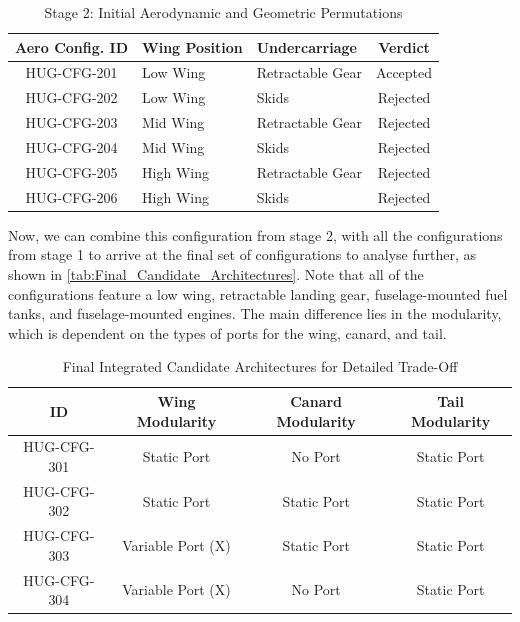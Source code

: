 \begin{table}[H]
    \centering
    \caption{Stage 2: Initial Aerodynamic and Geometric Permutations}
    \label{tab:Stage2_Aero_Configurations_Table}
    \renewcommand{\arraystretch}{1.3}
    \begin{tabular}{|c|p{4cm}|p{4cm}|c|}
        \hline
        \textbf{Aero Config. ID} & \textbf{Wing Position} & \textbf{Undercarriage} & \textbf{Verdict} \\
        \hline\hline
        HUG-CFG-201 & Low Wing & Retractable Gear & Accepted \\
        \hline
        HUG-CFG-202 & Low Wing & Skids & Rejected \\
        \hline
        HUG-CFG-203 & Mid Wing & Retractable Gear & Rejected \\
        \hline
        HUG-CFG-204 & Mid Wing & Skids & Rejected \\
        \hline
        HUG-CFG-205 & High Wing & Retractable Gear & Rejected \\
        \hline
        HUG-CFG-206 & High Wing & Skids & Rejected \\
        \hline
    \end{tabular}
\end{table}

Now, we can combine this configuration from stage 2, with all the configurations from stage 1 to arrive at the final set of configurations to analyse further, as shown in \autoref{tab:Final_Candidate_Architectures}. Note that all of the configurations feature a low wing, retractable landing gear, fuselage-mounted fuel tanks, and fuselage-mounted engines. The main difference lies in the modularity, which is dependent on the types of ports for the wing, canard, and tail.

\begin{table}[H]
    \centering
    \caption{Final Integrated Candidate Architectures for Detailed Trade-Off}
    \label{tab:Final_Candidate_Architectures}
    \renewcommand{\arraystretch}{1.3}
    \begin{tabular}{|c|c|c|c|}
        \hline
        \textbf{ID} & \textbf{Wing Modularity} & \textbf{Canard Modularity} & \textbf{Tail Modularity}    \\
        \hline\hline
        HUG-CFG-301 & Static Port & No Port & Static Port   \\
        \hline
        HUG-CFG-302 & Static Port &  Static Port & Static Port  \\
        \hline
        HUG-CFG-303 & Variable Port (X) & Static Port &  Static Port  \\
        \hline
        HUG-CFG-304 & Variable Port (X) & No Port &  Static Port \\
        \hline
    \end{tabular}
    
\end{table}

